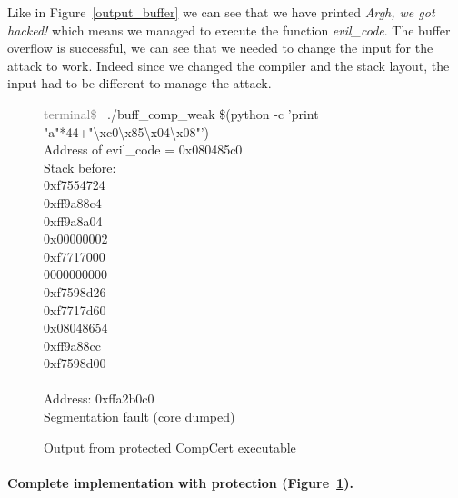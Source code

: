 \documentclass[11pt]{sdm}
\begin{document}
Like in Figure~\ref{output_buffer} we can see that we have printed \textit{Argh, we got hacked!} which means we managed to execute the function \textit{evil\_code}. The buffer overflow is successful, we can see that we needed to change the input for the attack to work. Indeed since we changed the compiler and the stack layout, the input had to be different to manage the attack. 

\begin{figure}[!ht]
\textcolor{gray}{terminal\$~} ./buff\_comp\_weak \$(python -c 'print "a"*44+"\textbackslash{xc0}\textbackslash{x85}\textbackslash{x04}\textbackslash{x08}"')\\
Address of evil\_code = 0x080485c0\\

Stack before:       \\
0xf7554724          \\
0xff9a88c4          \\
0xff9a8a04          \\
0x00000002          \\
0xf7717000          \\
0000000000          \\
0xf7598d26          \\
0xf7717d60          \\
0x08048654          \\
0xff9a88cc          \\
0xf7598d00          \\
                    \\
Address: 0xffa2b0c0 \\
Segmentation fault (core dumped)
\caption{Output from protected CompCert executable}
\label{output_protected}
\end{figure}

\paragraph{Complete implementation with protection (Figure~\ref{output_protected}).}
\label{par:Complete implementation with protection}
\end{document}
